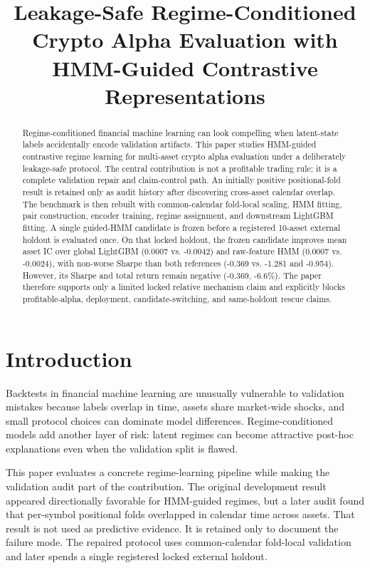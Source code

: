 \documentclass[sigconf,anonymous,review]{acmart}
\title{Leakage-Safe Regime-Conditioned Crypto Alpha Evaluation with HMM-Guided Contrastive Representations}
\begin{document}
\begin{abstract}
Regime-conditioned financial machine learning can look compelling when latent-state labels accidentally encode validation artifacts. This paper studies HMM-guided contrastive regime learning for multi-asset crypto alpha evaluation under a deliberately leakage-safe protocol. The central contribution is not a profitable trading rule; it is a complete validation repair and claim-control path. An initially positive positional-fold result is retained only as audit history after discovering cross-asset calendar overlap. The benchmark is then rebuilt with common-calendar fold-local scaling, HMM fitting, pair construction, encoder training, regime assignment, and downstream LightGBM fitting. A single guided-HMM candidate is frozen before a registered 10-asset external holdout is evaluated once. On that locked holdout, the frozen candidate improves mean asset IC over global LightGBM (0.0007 vs. -0.0042) and raw-feature HMM (0.0007 vs. -0.0024), with non-worse Sharpe than both references (-0.369 vs. -1.281 and -0.954). However, its Sharpe and total return remain negative (-0.369, -6.6\%). The paper therefore supports only a limited locked relative mechanism claim and explicitly blocks profitable-alpha, deployment, candidate-switching, and same-holdout rescue claims.
\end{abstract}


\maketitle

\section{Introduction}
Backtests in financial machine learning are unusually vulnerable to validation mistakes because labels overlap in time, assets share market-wide shocks, and small protocol choices can dominate model differences. Regime-conditioned models add another layer of risk: latent regimes can become attractive post-hoc explanations even when the validation split is flawed.

This paper evaluates a concrete regime-learning pipeline while making the validation audit part of the contribution. The original development result appeared directionally favorable for HMM-guided regimes, but a later audit found that per-symbol positional folds overlapped in calendar time across assets. That result is not used as predictive evidence. It is retained only to document the failure mode. The repaired protocol uses common-calendar fold-local validation and later spends a single registered locked external holdout.
\end{document}
